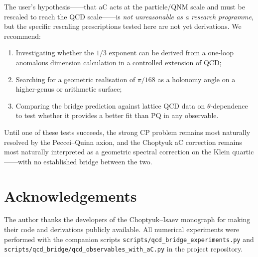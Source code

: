 \documentclass[11pt,a4paper]{article}
\newcommand{\aC}{a\text{-}C}
\theoremstyle{plain}
\theoremstyle{definition}
\theoremstyle{remark}
\begin{document}
\begin{verdict}
The user's hypothesis——that \aC{} acts at the particle/QNM scale and
must be rescaled to reach the QCD scale——is \emph{not unreasonable as
a research programme}, but the specific rescaling prescriptions tested
here are not yet derivations.  We recommend:
\begin{enumerate}[leftmargin=2em,itemsep=0.1em]
  \item Investigating whether the $1/3$ exponent can be derived from a
        one-loop anomalous dimension calculation in a controlled
        extension of QCD;
  \item Searching for a geometric realisation of $\pi/168$ as a
        holonomy angle on a higher-genus or arithmetic surface;
  \item Comparing the bridge prediction against lattice QCD data on
        $\theta$-dependence to test whether it provides a better fit
        than PQ in any observable.
\end{enumerate}
Until one of these tests succeeds, the strong CP problem remains most
naturally resolved by the Peccei--Quinn axion, and the Choptyuk \aC{}
correction remains most naturally interpreted as a geometric spectral
correction on the Klein quartic——with no established bridge between
the two.
\end{verdict}







\section*{Acknowledgements}
The author thanks the developers of the Choptyuk--Isaev monograph for
making their code and derivations publicly available.  All numerical
experiments were performed with the companion scripts
\texttt{scripts/qcd\_bridge\_experiments.py} and
\texttt{scripts/qcd\_bridge/qcd\_observables\_with\_aC.py}
in the project repository.
\end{document}
